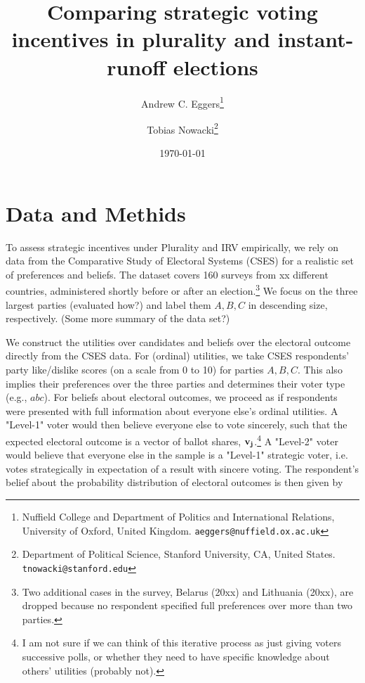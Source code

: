 \documentclass[12pt, letter]{article}
\begin{document}
\author{Andrew C. Eggers\thanks{Nuffield College and Department of Politics and International Relations, University of Oxford, United Kingdom. \texttt{aeggers@nuffield.ox.ac.uk}}
\and
Tobias Nowacki\thanks{Department of Political Science, Stanford University, CA, United States. \texttt{tnowacki@stanford.edu}}}
\date{\today}
\title{Comparing strategic voting incentives in plurality and instant-runoff elections}

\maketitle

\onehalfspacing %

\setcounter{section}{4}

\section{Data and Methids}

To assess strategic incentives under Plurality and IRV empirically, we rely on data from the  Comparative Study of Electoral Systems (CSES) for a realistic set of preferences and beliefs. The dataset covers 160 surveys from xx different countries, administered shortly before or after an election.\footnote{Two additional cases in the survey, Belarus (20xx) and Lithuania (20xx), are dropped because no respondent specified full preferences over more than two parties.} We focus on the three largest parties (evaluated how?) and label them $A, B, C$ in descending size, respectively. (Some more summary of the data set?)

We construct the utilities over candidates and beliefs over the electoral outcome directly from the CSES data. For (ordinal) utilities, we take CSES respondents' party like/dislike scores (on a scale from 0 to 10) for parties $A, B, C$. This also implies their preferences over the three parties and determines their voter type (e.g., $abc$). For beliefs about electoral outcomes, we proceed as if respondents were presented with full information about everyone else's ordinal utilities. A "Level-1" voter would then believe everyone else to vote sincerely, such that the expected electoral outcome is a vector of ballot shares, $\bf v_j$.\footnote{I am not sure if we can think of this iterative process as just giving voters successive polls, or whether they need to have specific knowledge about others' utilities (probably not).} A "Level-2" voter would believe that everyone else in the sample is a "Level-1" strategic voter, i.e. votes strategically in expectation of a result with sincere voting. The respondent's belief about the probability distribution of electoral outcomes is then given by
\end{document}
